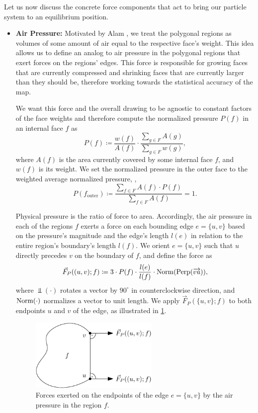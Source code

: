 Let us now discuss the concrete force components that act to bring our particle system to an equilibrium position.
%
\begin{itemize}
\item \textbf{Air Pressure:} %
Motivated by Alam \etal{} \cite{alam2013computing}, we treat the polygonal regions as volumes of some amount of air equal to the respective face's weight.
This idea allows us to define an analog to air pressure in the polygonal regions that exert forces on the regions' edges.
This force is responsible for growing faces that are currently compressed and shrinking faces that are currently larger than they should be, therefore working towards the statistical accuracy of the map.

We want this force and the overall drawing to be agnostic to constant factors of the face weights and therefore compute the normalized pressure $P(f)$ in an internal face $f$ as
%
\begin{equation*}
	P(f) \coloneqq \frac{w(f)}{A(f)} \cdot \frac{\sum_{g \in F}{A(g)}}{\sum_{g \in F}{w(g)}},
\end{equation*}
%
where $A(f)$ is the area currently covered by some internal face $f$, and $w(f)$ is its weight.
We set the normalized pressure in the outer face to the weighted average normalized pressure, \ie{},
%
\begin{equation*}
	P(f_\text{outer}) \coloneqq \frac{\sum_{f \in F}{A(f) \cdot P(f)}}{\sum_{f \in F}{A(f)}} = 1.
\end{equation*}

Physical pressure is the ratio of force to area.
Accordingly, the air pressure in each of the regions $f$ exerts a force on each bounding edge $e = \{u,v\}$ based on the pressure's magnitude and the edge's length $l(e)$ in relation to the entire region's boundary's length $l(f)$.
We orient $e = \{u,v\}$ such that $u$ directly precedes $v$ on the boundary of $f$, and define the force as
%
\begin{equation}
	\vec{F}_P((u,v);f) \coloneqq
	3 \cdot P(f)\cdot\frac{l(e)}{l(f)}
	\cdot \operatorname{Norm}(\operatorname{Perp}(\overrightarrow{vu}))
	,
\end{equation}
%
where $\Perp(\cdot)$ rotates a vector by $90^\circ$ in counterclockwise direction, and $\operatorname{Norm}(\cdot)$ normalizes a vector to unit length.
We apply $\vec{F}_P(\{u,v\};f)$ to both endpoints $u$ and $v$ of the edge, as illustrated in \cref{fig:drawing-forces-air-pressure}.

\begin{figure}[H]
	\centering
	\includegraphics[height=35mm]{Resources/Drawing-Forces-AirPressure.pdf}
	\caption{Forces exerted on the endpoints of the edge $e = \{u,v\}$ by the air pressure in the region $f$.}
	\label{fig:drawing-forces-air-pressure}
\end{figure}


\end{itemize}
